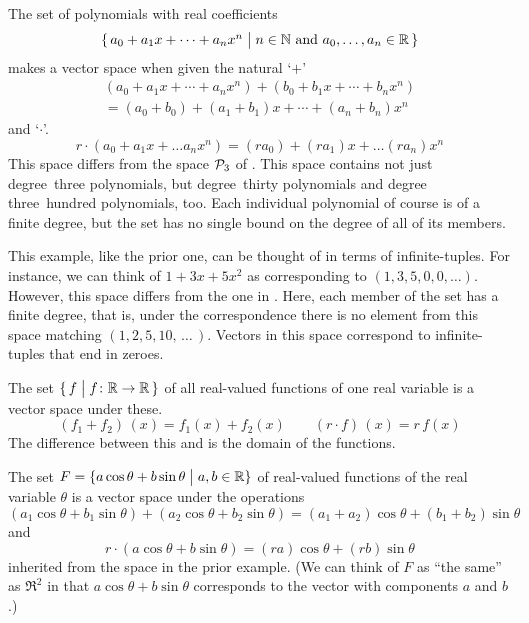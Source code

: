 \begin{example} \label{ex:PolysOfAllFiniteDegrees}
The set of polynomials with real coefficients
\begin{equation*}
 \mbox{$\{\, a_0+a_1x+\cdots+a_nx^n\bigm| n\in\mathbb{N}
    \text{ and } a_0,\ldots,a_n\in\mathbb{R}\,\}$} 
\end{equation*}
makes a vector space when given the natural `$+$' 
\begin{multline*}
  (a_0+a_1x+\cdots+a_nx^n)+(b_0+b_1x+\cdots+b_nx^n)  \\
     =(a_0+b_0)+(a_1+b_1)x+\cdots +(a_n+b_n)x^n
\end{multline*}
and `$\cdot$'.
\begin{equation*}
  r\cdot (a_0+a_1x+\ldots a_nx^n)
   =
  (ra_0)+(ra_1)x+\ldots (ra_n)x^n
\end{equation*}
This space differs from the space $\mathcal{P}_3$ of
.
This space contains not just degree~three polynomials, 
but degree~thirty polynomials and
degree three~hundred polynomials, too.
Each individual polynomial of course is of a finite degree, 
but the set has no single bound on the degree of all of its members.

This example, like the prior one,  
can be thought of in terms of infinite-tuples.
For instance, we can think of \( 1+3x+5x^2 \) as corresponding to
\( (1,3,5,0,0,\ldots) \).
However, this space differs from the one in
.
Here, each member of the set has a finite degree, that is,
under the correspondence there is no element from this space 
matching \( (1,2,5,10,\,\ldots\,) \).
Vectors in this space correspond to infinite-tuples
that end in zeroes.
\end{example}

\begin{example}  \label{ex:RealValuedFcns}
The set
\( \mbox{$\{\,f\bigm| \mbox{$f\colon \mathbb{R}\to \mathbb{R}$} \,\}$} \)
of all real-valued functions of one real variable
is a vector space under these.
\begin{equation*}
  (f_1+f_2)\,(x)=f_1(x)+f_2(x)
  \qquad
  (r\cdot f)\,(x)=r\,f(x)
\end{equation*}
The difference between this and  is the
domain of the functions.
\end{example}

\begin{example}\label{ex:ACos+BSin}
The set
\( F=\{ a\cos\theta+b\sin\theta \bigm| a,b\in\mathbb{R}\} \)
of real-valued functions of the real variable \( \theta \)
is a vector space under the operations
\begin{equation*}
  (a_1\cos\theta+b_1\sin\theta)+(a_2\cos\theta+b_2\sin\theta)
    =(a_1+a_2)\cos\theta+(b_1+b_2)\sin\theta
\end{equation*}
and
\begin{equation*}
  r\cdot (a\cos\theta+b\sin\theta)
   =(ra)\cos\theta+(rb)\sin\theta
\end{equation*}
inherited from the space in the prior example.
(We can think of \( F \) as ``the same'' as \( \Re^2 \)
in that $a\cos\theta+b\sin\theta$ corresponds to the vector with
components $a$ and $b$.)
\end{example}

